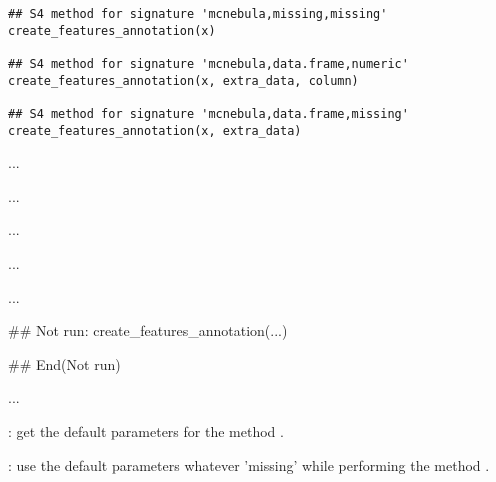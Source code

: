 \documentclass[letterpaper]{book}
\begin{document}
%
\begin{Usage}
\begin{verbatim}
## S4 method for signature 'mcnebula,missing,missing'
create_features_annotation(x)

## S4 method for signature 'mcnebula,data.frame,numeric'
create_features_annotation(x, extra_data, column)

## S4 method for signature 'mcnebula,data.frame,missing'
create_features_annotation(x, extra_data)
\end{verbatim}
\end{Usage}
%
\begin{Arguments}
\begin{ldescription}
\item[\code{x}] ...

\item[\code{extra\_data}] ...

\item[\code{column}] ...
\end{ldescription}
\end{Arguments}
%
\begin{Details}\relax
...
\end{Details}
%
\begin{Value}
...
\end{Value}
%
\begin{SeeAlso}\relax
{}
\end{SeeAlso}
%
\begin{Examples}
\begin{ExampleCode}
## Not run: 
create_features_annotation(...)

## End(Not run)
\end{ExampleCode}
\end{Examples}
%
\begin{Description}\relax
...

: get the default parameters for the method
.

: use the default parameters whatever 'missing'
while performing the method .
\end{Description}
\end{document}
